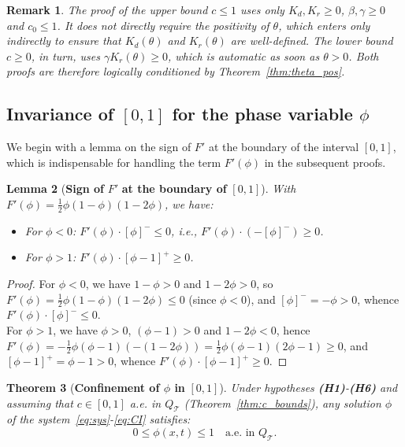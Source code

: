 \documentclass[final,1p,times]{elsarticle}
\numberwithin{equation}{section}
\newtheorem{theorem}{Theorem}[section]
\newtheorem{lemma}[theorem]{Lemma}
\newtheorem{remark}[theorem]{Remark}
\newcommand{\QT}{Q_{\mathcal{T}}}
\newcommand{\ppos}[1]{\left[#1\right]^{+}}
\newcommand{\pneg}[1]{\left[#1\right]^{-}}
\begin{document}
	\begin{remark}
		The proof of the upper bound $c \leq 1$ uses only $K_d, K_r \geq 0$, $\beta,\gamma \geq 0$
		and $c_0 \leq 1$. It does not directly require the positivity of $\theta$, which enters
		only indirectly to ensure that $K_d(\theta)$ and $K_r(\theta)$ are well-defined. The
		lower bound $c \geq 0$, in turn, uses $\gamma K_r(\theta) \geq 0$, which is automatic
		as soon as $\theta > 0$. Both proofs are therefore logically conditioned by
		Theorem~\ref{thm:theta_pos}.
	\end{remark}
	
	\subsection{Invariance of $[0,1]$ for the phase variable $\phi$}
	\label{sub:phi}
	
	We begin with a lemma on the sign of $F'$ at the boundary of the interval $[0,1]$,
	which is indispensable for handling the term $F'(\phi)$ in the subsequent proofs.
	
	\begin{lemma}[\textbf{Sign of} $F'$ \textbf{at the boundary of} {$[0,1]$}]
		\label{lem:F_sign}
		With $F'(\phi) = \tfrac12\phi(1-\phi)(1-2\phi)$, we have:
		\begin{itemize}
			\item For $\phi < 0$: $F'(\phi)\cdot\pneg{\phi} \leq 0$, i.e.,
			$F'(\phi)\cdot(-\pneg{\phi}) \geq 0$.
			\item For $\phi > 1$: $F'(\phi)\cdot\ppos{\phi-1} \geq 0$.
		\end{itemize}
	\end{lemma}
	
	\begin{proof}
		For $\phi < 0$, we have $1 - \phi > 0$ and $1 - 2\phi > 0$, so
		$F'(\phi) = \frac12\phi(1-\phi)(1-2\phi) \leq 0$ (since $\phi < 0$),
		and $\pneg{\phi} = -\phi > 0$, whence $F'(\phi)\cdot\pneg{\phi} \leq 0$.\\
		For $\phi > 1$, we have $\phi > 0$, $(\phi-1) > 0$ and $1-2\phi < 0$, hence
		$F'(\phi) = -\frac12\phi(\phi-1)(-(1-2\phi)) = \frac12\phi(\phi-1)(2\phi-1) \geq 0$,
		and $\ppos{\phi-1} = \phi - 1 > 0$, whence $F'(\phi)\cdot\ppos{\phi-1} \geq 0$.
	\end{proof}
	
	\begin{theorem}[\textbf{Confinement of $\phi$ in} {$[0,1]$}]
		\label{thm:phi_bounds}
		Under hypotheses \textup{\textbf{(H1)}}-\textup{\textbf{(H6)}} and assuming that
		$c \in [0,1]$ a.e. in $\QT$ \textup{(Theorem~\ref{thm:c_bounds})}, any solution $\phi$
		of the system~\eqref{eq:sys}-\eqref{eq:CI} satisfies:
		\[
		0 \leq \phi(x,t) \leq 1 \quad\text{a.e. in } \QT.
		\]
	\end{theorem}
	
\end{document}
